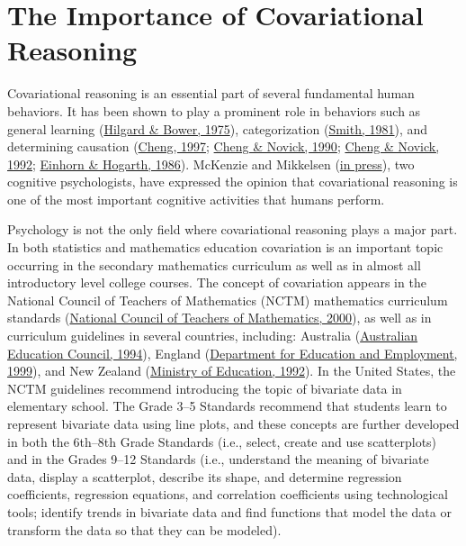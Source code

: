\documentclass[11pt]{umnthesis}
\begin{document}
\hypertarget{the-importance-of-covariational-reasoning}{%
\section{The Importance of Covariational Reasoning}\label{the-importance-of-covariational-reasoning}}

Covariational reasoning is an essential part of several fundamental human behaviors. It has been shown to play a prominent role in behaviors such as general learning (\protect\hyperlink{ref-hilgard:1975}{Hilgard \& Bower, 1975}), categorization (\protect\hyperlink{ref-smith:1981}{Smith, 1981}), and determining causation (\protect\hyperlink{ref-cheng:1997}{Cheng, 1997}; \protect\hyperlink{ref-cheng:1990}{Cheng \& Novick, 1990}; \protect\hyperlink{ref-cheng:1992}{Cheng \& Novick, 1992}; \protect\hyperlink{ref-einhorn:1986}{Einhorn \& Hogarth, 1986}). McKenzie and Mikkelsen (\protect\hyperlink{ref-mckenzie:inpress}{in press}), two cognitive psychologists, have expressed the opinion that covariational reasoning is one of the most important cognitive activities that humans perform.

Psychology is not the only field where covariational reasoning plays a major part. In both statistics and mathematics education covariation is an important topic occurring in the secondary mathematics curriculum as well as in almost all introductory level college courses. The concept of covariation appears in the National Council of Teachers of Mathematics (NCTM) mathematics curriculum standards (\protect\hyperlink{ref-nctm:2000}{National Council of Teachers of Mathematics, 2000}), as well as in curriculum guidelines in several countries, including: Australia (\protect\hyperlink{ref-australian-education-council:1994}{Australian Education Council, 1994}), England (\protect\hyperlink{ref-department-for-education-and-employment:1999}{Department for Education and Employment, 1999}), and New Zealand (\protect\hyperlink{ref-ministry-of-education:1992}{Ministry of Education, 1992}). In the United States, the NCTM guidelines recommend introducing the topic of bivariate data in elementary school. The Grade 3--5 Standards recommend that students learn to represent bivariate data using line plots, and these concepts are further developed in both the 6th--8th Grade Standards (i.e., select, create and use scatterplots) and in the Grades 9--12 Standards (i.e., understand the meaning of bivariate data, display a scatterplot, describe its shape, and determine regression coefficients, regression equations, and correlation coefficients using technological tools; identify trends in bivariate data and find functions that model the data or transform the data so that they can be modeled).
\end{document}
